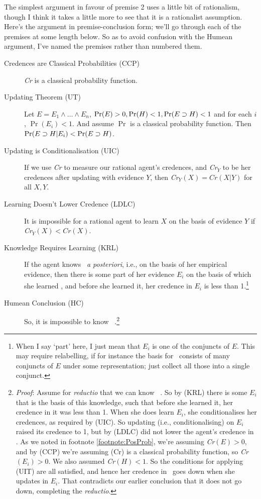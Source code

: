 The simplest argument in favour of premise 2 uses a little bit of rationalism, though I think it takes a little more to see that it is a rationalist assumption. Here's the argument in premise-conclusion form; we'll go through each of the premises at some length below. So as to avoid confusion with the Humean argument, I've named the premises rather than numbered them.

\begin{description}
\item[Credences are Classical Probabilities (CCP)] \textit{Cr} is a classical probability function.
\item[Updating Theorem (UT)] Let $E = E_1 \wedge \dots \wedge E_n$, $\Pr(E) > 0, \Pr(H) < 1, \Pr(E \supset H) < 1$ and for each $i$, $\Pr(E_i) < 1$. And assume $\Pr$ is a classical probability function. Then $\Pr(E \supset H | E_i) < \Pr(E \supset H)$.
\item[Updating is Conditionalisation (UIC)] If we use \textit{Cr} to measure our rational agent's credences, and \textit{Cr}$_Y$ to be her credences after updating with evidence $Y$, then \textit{Cr}$_Y(X) = \textit{Cr}(X | Y)$ for all $X, Y$.
\item[Learning Doesn't Lower Credence (LDLC)] It is impossible for a rational agent to learn $X$ on the basis of evidence $Y$ if \textit{Cr}$_Y(X) < \textit{Cr}(X)$.
\item[Knowledge Requires Learning (KRL)] If the agent knows \ECH\ \textit{a posteriori}, i.e., on the basis of her empirical evidence, then there is some part of her evidence $E_i$ on the basis of which she learned \ECH, and before she learned it, her credence in $E_i$ is less than 1.\footnote{When I say `part' here, I just mean that $E_i$ is one of the conjuncts of $E$. This may require relabelling, if for instance the basis for \ECH\ consists of many conjuncts of $E$ under some representation; just collect all those into a single conjunct.}
\item[Humean Conclusion (HC)] So, it is impossible to know \ECH\ \apo.\footnote{
\textit{Proof}: Assume for \textit{reductio} that we can know \ECH\ \apo. So by (KRL) there is some $E_i$ that is the basis of this knowledge, such that before she learned it, her credence in it was less than 1. When she does learn $E_i$, she conditionalises her credences, as required by (UIC). So updating (i.e., conditionalising) on $E_i$ raised its credence to 1, but by (LDLC) did not lower the agent's credence in \ECH. As we noted in footnote \ref{footnote:PosProb}, we're assuming \textit{Cr}$(E) > 0$, and by (CCP) we're assuming (Cr) is a classical probability function, so \textit{Cr}$(E_i) > 0$. We also assumed \textit{Cr}$(H) < 1$. So the conditions for applying (UIT) are all satisfied, and hence her credence in \ECH\ goes down when she updates in $E_i$. That contradicts our earlier conclusion that it does not go down, completing the \textit{reductio}.}
\end{description}

